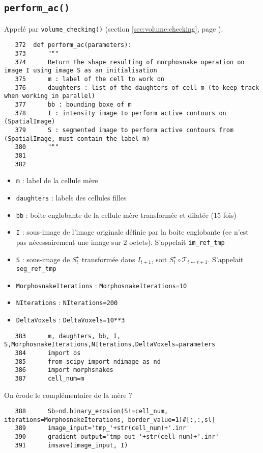 \documentclass{article}
\def \mycolor {red}
\begin{document}
\subsection{\texttt{perform\_ac()}}
\label{sec:perform:ac}
Appel\'e par \texttt{volume\_checking()}
(section \ref{sec:volume:checking}, page \pageref{sec:volume:checking}).

\begin{verbatim}
   372	def perform_ac(parameters):
   373	    """
   374	    Return the shape resulting of morphosnake operation on image I using image S as an initialisation
   375	    m : label of the cell to work on
   376	    daughters : list of the daughters of cell m (to keep track when working in parallel)
   377	    bb : bounding boxe of m
   378	    I : intensity image to perform active contours on (SpatialImage)
   379	    S : segmented image to perform active contours from (SpatialImage, must contain the label m)
   380	    """
   381	
   382	
\end{verbatim} 
\color{\mycolor}
\begin{itemize}
\itemsep -0.5ex
\item \verb|m| : label de la cellule m\`ere 
\item \verb|daughters| : labels des cellules filles
\item \verb|bb| : boite englobante de la cellule m\`ere transform\'ee et dilat\'ee (15 fois)
\item \verb|I| : sous-image de l'image originale d\'efinie par la boite englobante (ce n'est pas n\'ecessairement une image sur 2 octets). S'appelait  \verb|im_ref_tmp|
\item \verb|S| : sous-image de $S^{\star}_t$ transform\'ee dans $I_{t+1}$, soit $S^{\star}_t \circ \mathcal{T}_{t \leftarrow t+1}$. S'appelait  \verb|seg_ref_tmp|
\item \verb|MorphosnakeIterations| : \verb|MorphosnakeIterations=10|
\item \verb|NIterations| : \verb|NIterations=200|
\item \verb|DeltaVoxels| : \verb|DeltaVoxels=10**3|
\end{itemize}
\color{black}
\begin{verbatim}
   383	    m, daughters, bb, I, S,MorphosnakeIterations,NIterations,DeltaVoxels=parameters
   384	    import os
   385	    from scipy import ndimage as nd
   386	    import morphsnakes
   387	    cell_num=m
\end{verbatim} 
\color{\mycolor}
On \'erode le compl\'ementaire de la m\`ere ?
\color{black}
\begin{verbatim} 
   388	    Sb=nd.binary_erosion(S!=cell_num, iterations=MorphosnakeIterations, border_value=1)#[:,:,sl]
   389	    image_input='tmp_'+str(cell_num)+'.inr'
   390	    gradient_output='tmp_out_'+str(cell_num)+'.inr'
   391	    imsave(image_input, I)
\end{verbatim} 
\end{document}
